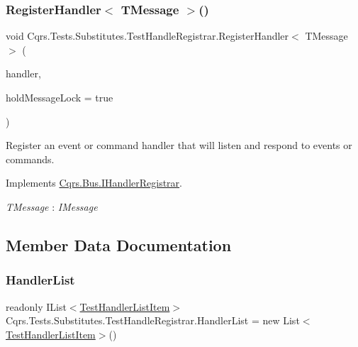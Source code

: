 \subsubsection{\texorpdfstring{Register\+Handler$<$ T\+Message $>$()}{RegisterHandler< TMessage >()}}
{\footnotesize\ttfamily void Cqrs.\+Tests.\+Substitutes.\+Test\+Handle\+Registrar.\+Register\+Handler$<$ T\+Message $>$ (\begin{DoxyParamCaption}\item[{Action$<$ T\+Message $>$}]{handler,  }\item[{bool}]{hold\+Message\+Lock = {\ttfamily true} }\end{DoxyParamCaption})}



Register an event or command handler that will listen and respond to events or commands. 



Implements \hyperlink{interfaceCqrs_1_1Bus_1_1IHandlerRegistrar_a07792dcc9a8b272709ff2e2dd336a642_a07792dcc9a8b272709ff2e2dd336a642}{Cqrs.\+Bus.\+I\+Handler\+Registrar}.

\begin{Desc}
\item[Type Constraints]\begin{description}
\item[{\em T\+Message} : {\em I\+Message}]\end{description}
\end{Desc}


\subsection{Member Data Documentation}
\mbox{\label{classCqrs_1_1Tests_1_1Substitutes_1_1TestHandleRegistrar_a56823149a39f6208108030de47e70e09_a56823149a39f6208108030de47e70e09}} 
\subsubsection{\texorpdfstring{Handler\+List}{HandlerList}}
{\footnotesize\ttfamily readonly I\+List$<$\hyperlink{classCqrs_1_1Tests_1_1Substitutes_1_1TestHandlerListItem}{Test\+Handler\+List\+Item}$>$ Cqrs.\+Tests.\+Substitutes.\+Test\+Handle\+Registrar.\+Handler\+List = new List$<$\hyperlink{classCqrs_1_1Tests_1_1Substitutes_1_1TestHandlerListItem}{Test\+Handler\+List\+Item}$>$()\hspace{0.3cm}{\ttfamily [static]}}

